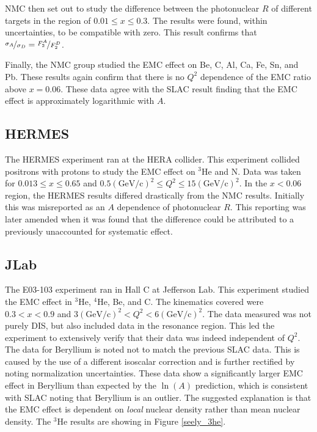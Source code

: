 NMC then set out to study the difference between the photonuclear $R$ of different targets in the region of $0.01 \leq x \leq 0.3$. The results were found, within uncertainties, to be compatible with zero. This result confirms that $\nicefrac{\sigma_A}{\sigma_D}=\nicefrac{F_2^A}{F_2^D}$.

Finally, the NMC group studied the EMC effect on Be, C, Al, Ca, Fe, Sn, and Pb. These results again confirm that there is no $Q^2$ dependence of the EMC ratio above $x=0.06$. These data agree with the SLAC result finding that the EMC effect is approximately logarithmic with $A$.\cite{NMC}


\subsection{HERMES}
The HERMES experiment ran at the HERA collider. This experiment collided positrons with protons to study the EMC effect on $^3$He and N. Data was taken for $0.013 \le x \le 0.65$ and $0.5 \left(\textrm{GeV/c}\right)^2 \le Q^2 \le 15 \left(\textrm{GeV/c}\right)^2$. In the $x<0.06$ region, the HERMES results differed drastically from the NMC results. Initially this was misreported as an $A$ dependence of photonuclear $R$. This reporting was later amended when it was found that the difference could be attributed to a previously unaccounted for systematic effect.

\subsection{JLab}
The E03-103 experiment ran in Hall C at Jefferson Lab. This experiment studied the EMC effect in $^3$He, $^4$He, Be, and C. The kinematics covered were $0.3 < x < 0.9$ and $3 \left(\textrm{GeV/c}\right)^2 < Q^2 < 6 \left(\textrm{GeV/c}\right)^2$. The data measured was not purely DIS, but also included data in the resonance region. This led the experiment to extensively verify that their data was indeed independent of $Q^2$. The data for Beryllium is noted not to match the previous SLAC data. This is caused by the use of a different isoscalar correction and is further rectified by noting normalization uncertainties. These data show a significantly larger EMC effect in Beryllium than expected by the $\ln\left(A\right)$ prediction, which is consistent with SLAC noting that Beryllium is an outlier. The suggested explanation is that the EMC effect is dependent on \textit{local} nuclear density rather than mean nuclear density. The $^3$He results are showing in Figure \ref{seely_3he}.\cite{e03103}


